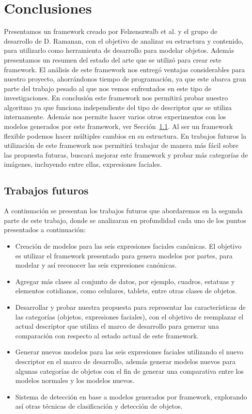 \chapter[Conclusiones]{Conclusiones}\label{ch:capitulo6}
Presentamos un framework creado por Felzenszwalb et al. y el grupo de desarrollo de D. Ramanan, con el objetivo de analizar su estructura y contenido, para utilizarlo como herramienta de desarrollo para modelar objetos. Además presentamos un resumen del estado del arte que se utilizó para crear este framework. El análisis de este framework nos entregó ventajas considerables para nuestro proyecto, ahorrándonos tiempo de programación, ya que este abarca gran parte del trabajo pesado al que nos vemos enfrentados en este tipo de investigaciones. En conclusión este framework nos permitirá probar nuestro algoritmo ya que funciona independiente del tipo de descriptor que se utiliza internamente. Además nos permite hacer varios otros experimentos con los modelos generados por este framework, ver Sección~\ref{sec:future}. Al ser un framework flexible podemos hacer múltiples cambios en su estructura. En trabajos futuros la utilización de este framework nos permitirá trabajar de manera más fácil sobre las propuesta futuras, buscará mejorar este framework y probar más categorías de imágenes, incluyendo entre ellas, expresiones faciales. 

\section{Trabajos futuros}\label{sec:future}
A continuación se presentan los trabajos futuros que abordaremos en la segunda parte de este trabajo, donde se analizaran en profundidad cada uno de los puntos presentados a continuación:
\begin{itemize}
\item Creación de modelos para las seis expresiones faciales canónicas. El objetivo es utilizar el framework presentado para genera modelos por partes, para modelar y así reconocer las seis expresiones canónicas.

\item Agregar más clases al conjunto de datos, por ejemplo, cuadros, estatuas y elementos cotidianos, como celulares, tablets, entre otras clases de objetos.

\item Desarrollar y probar nuestra propuesta para representar las características de las categorías (objetos, expresiones faciales), con el objetivo de reemplazar el actual descriptor que utiliza el marco de desarrollo para generar una comparación con respecto al estado actual de este framework.

\item Generar nuevos modelos para las seis expresiones faciales utilizando el nuevo descriptor en el marco de desarrollo, además generar modelos nuevos para algunas categorías de objetos con el fin de generar una comparativa entre los modelos normales y los modelos nuevos.

\item Sistema de detección en base a modelos generados por framework, explorando así otras técnicas de clasificación y detección de objetos.
\end{itemize}